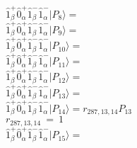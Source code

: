 \documentclass[14pt]{article}
\begin{document}
    $ \hat{1}_{\beta}^{+}\hat{0}_{\alpha}^{+}\hat{1}_{\beta}^{-}\hat{1}_{\alpha}^{-} \vert{P_{8}}\rangle =  $ \\ 
    $ \hat{1}_{\beta}^{+}\hat{0}_{\alpha}^{+}\hat{1}_{\beta}^{-}\hat{1}_{\alpha}^{-} \vert{P_{9}}\rangle =  $ \\ 
    $ \hat{1}_{\beta}^{+}\hat{0}_{\alpha}^{+}\hat{1}_{\beta}^{-}\hat{1}_{\alpha}^{-} \vert{P_{10}}\rangle =  $ \\ 
    $ \hat{1}_{\beta}^{+}\hat{0}_{\alpha}^{+}\hat{1}_{\beta}^{-}\hat{1}_{\alpha}^{-} \vert{P_{11}}\rangle =  $ \\ 
    $ \hat{1}_{\beta}^{+}\hat{0}_{\alpha}^{+}\hat{1}_{\beta}^{-}\hat{1}_{\alpha}^{-} \vert{P_{12}}\rangle =  $ \\ 
    $ \hat{1}_{\beta}^{+}\hat{0}_{\alpha}^{+}\hat{1}_{\beta}^{-}\hat{1}_{\alpha}^{-} \vert{P_{13}}\rangle =  $ \\ 
    $ \hat{1}_{\beta}^{+}\hat{0}_{\alpha}^{+}\hat{1}_{\beta}^{-}\hat{1}_{\alpha}^{-} \vert{P_{14}}\rangle = {r}_{287,13,14}P_{13} $ \\ 
    ${r}_{287,13,14}\ =\ 1 $ \\ 
    $ \hat{1}_{\beta}^{+}\hat{0}_{\alpha}^{+}\hat{1}_{\beta}^{-}\hat{1}_{\alpha}^{-} \vert{P_{15}}\rangle =  $ \\ 
    
\end{document}
